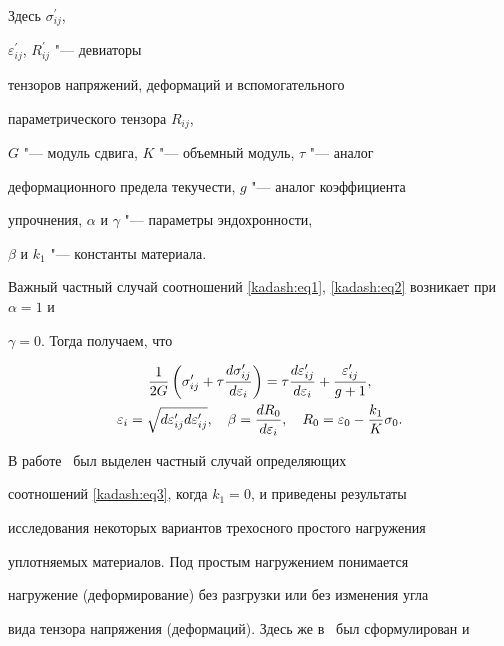 \noindent Здесь $\sigma_{ij}^{\prime}$,

$\varepsilon_{ij}^{\prime}$, $R_{ij}^{\prime}$ "--- девиаторы

тензоров напряжений, деформаций и вспомогательного

параметрического тензора $R_{ij}$,

$G$ "--- модуль сдвига, $K$ "--- объемный модуль, $\tau$ "--- аналог

деформационного предела текучести, $g$ "--- аналог коэффициента

упрочнения, $\alpha$ и $\gamma$ "--- параметры эндохронности,

$\beta$ и $k_1$ "--- константы материала.





Важный частный случай соотношений \eqref{kadash:eq1}, \eqref{kadash:eq2} возникает при $\alpha=1$ и

$\gamma=0$. Тогда получаем, что

\begin{gather}

\label{kadash:eq3}

\frac{1}{2G} \left(\sigma_{ij}^{\prime}

+\tau\frac{d\sigma_{ij}^{\prime}}{d\varepsilon_i} \right)=\tau

\frac{d\varepsilon_{ij}^{\prime}}{d\varepsilon_i}+\frac{\varepsilon_{ij}^{\prime}}{g+1},\\

\notag

\varepsilon_{i}=\sqrt{d\varepsilon_{ij}^{\prime}

d\varepsilon_{ij}^{\prime}},\quad  \beta=

\frac{dR_0}{d\varepsilon_i}, \quad R_0=\varepsilon_0-\frac{k_1}{K} \sigma_0.

\end{gather}



\noindent В работе~\cite{TUPP-2008} был выделен частный случай определяющих

соотношений \eqref{kadash:eq3}, когда $k_1=0$, и приведены результаты

исследования некоторых вариантов трехосного простого нагружения

уплотняемых материалов. Под простым  нагружением понимается

нагружение (деформирование) без разгрузки или без изменения угла

вида тензора напряжения (деформаций). Здесь же в~\cite{TUPP-2008} был сформулирован и


